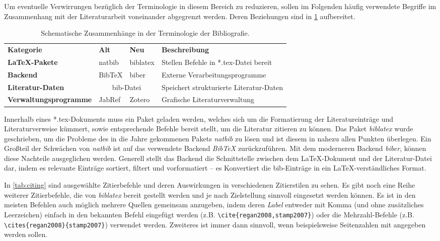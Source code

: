 \documentclass[
%
	thesis=paper,		%
	compactlistof,		%
	noauthorship,		%
%
	fancy,				%
%
%
]{hsmw-thesis}
\begin{document}
	Um eventuelle Verwirrungen bezüglich der Terminologie in diesem Bereich zu reduzieren, sollen im Folgenden häufig verwendete Begriffe im Zusammenhang mit der Literaturarbeit voneinander abgegrenzt werden.
	Deren Beziehungen sind in \cref{tab:bibliography} aufbereitet.

	\begin{table}[!htb]
		\centering
		\caption{Schematische Zusammenhänge in der Terminologie der Bibliografie.}
		\label{tab:bibliography}
		\begin{tabular}{llll}
			\toprule
			\textbf{Kategorie} & \textbf{Alt} & \textbf{Neu} & \textbf{Beschreibung} \\
			\cmidrule(r){1-1}
			\cmidrule(lr){2-3}
			\cmidrule(l){4-4}
			\textbf{LaTeX-Pakete} & natbib & biblatex & Stellen Befehle in *.tex-Datei bereit \\
			\textbf{Backend} & BibTeX & biber & Externe Verarbeitungsprogramme \\
			\textbf{Literatur-Daten} & \multicolumn{2}{c}{bib-Datei} & Speichert strukturierte Literatur-Daten \\
			\textbf{Verwaltungsprogramme} & JabRef & Zotero & Grafische Literaturverwaltung \\
			\bottomrule
		\end{tabular}		
	\end{table}
	
	Innerhalb eines *.tex-Dokuments muss ein Paket geladen werden, welches sich um die Formatierung der Literatureinträge und Literaturverweise kümmert, sowie entsprechende Befehle bereit stellt, um die Literatur zitieren zu können.
	Das Paket \textit{biblatex} wurde geschrieben, um die Probleme des in die Jahre gekommenen Pakets \textit{natbib} zu lösen und ist diesem in nahezu allen Punkten überlegen.
	Ein Großteil der Schwächen von \textit{natbib} ist auf das verwendete Backend \textit{BibTeX} zurückzuführen.
	Mit dem moderneren Backend \textit{biber}, können diese Nachteile ausgeglichen werden.
	Generell stellt das Backend die Schnittstelle zwischen dem LaTeX-Dokument und der Literatur-Datei dar, indem es relevante Einträge sortiert, filtert und vorformatiert -- es Konvertiert die bib-Einträge in ein LaTeX-verständliches Format.
	
	In \cref{tab:citing} sind ausgewählte Zitierbefehle und deren Auswirkungen in verschiedenen Zitierstilen zu sehen.
	Es gibt noch eine Reihe weiterer Zitierbefehle, die von \textit{biblatex} bereit gestellt werden und je nach Zielstellung sinnvoll eingesetzt werden können.
	Es ist in den meisten Befehlen auch möglich mehrere Quellen gemeinsam anzugeben, indem deren \textit{Label} entweder mit Komma (und ohne zusätzliches Leerzeichen) einfach in den bekannten Befehl eingefügt werden (z.B. \verb|\cite{regan2008,stamp2007}|) oder die Mehrzahl-Befehle (z.B. \verb|\cites{regan2008}{stamp2007}|) verwendet werden.
	Zweiteres ist immer dann sinnvoll, wenn beispielsweise Seitenzahlen mit angegeben werden sollen.
		
\end{document}
